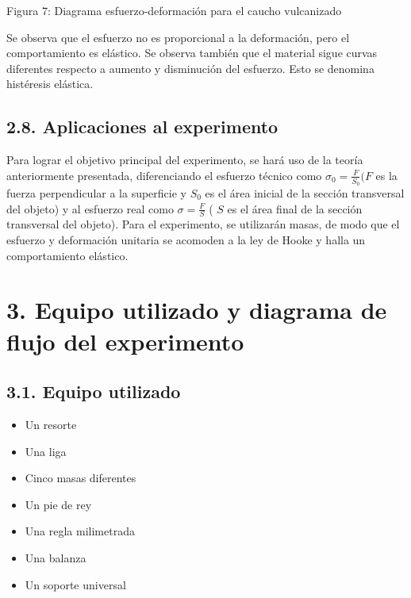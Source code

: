 \documentclass[10pt]{article}
\begin{document}
Figura 7: Diagrama esfuerzo-deformación para el caucho vulcanizado

Se observa que el esfuerzo no es proporcional a la deformación, pero el comportamiento es elástico. Se observa también que el material sigue curvas diferentes respecto a aumento y disminución del esfuerzo. Esto se denomina histéresis elástica.

\subsection*{2.8. Aplicaciones al experimento}
Para lograr el objetivo principal del experimento, se hará uso de la teoría anteriormente presentada, diferenciando el esfuerzo técnico como $\sigma_{0}=\frac{F}{S_{0}}(F$ es la fuerza perpendicular a la superficie y $S_{0}$ es el área inicial de la sección transversal del objeto) y al esfuerzo real como $\sigma=\frac{F}{S}$ ( $S$ es el área final de la sección transversal del objeto). Para el experimento, se utilizarán masas, de modo que el esfuerzo y deformación unitaria se acomoden a la ley de Hooke y halla un comportamiento elástico.

\section*{3. Equipo utilizado y diagrama de flujo del experimento}
\subsection*{3.1. Equipo utilizado}
\begin{itemize}
  \item Un resorte
  \item Una liga
  \item Cinco masas diferentes
  \item Un pie de rey
  \item Una regla milimetrada
  \item Una balanza
  \item Un soporte universal
\end{itemize}
\end{document}

